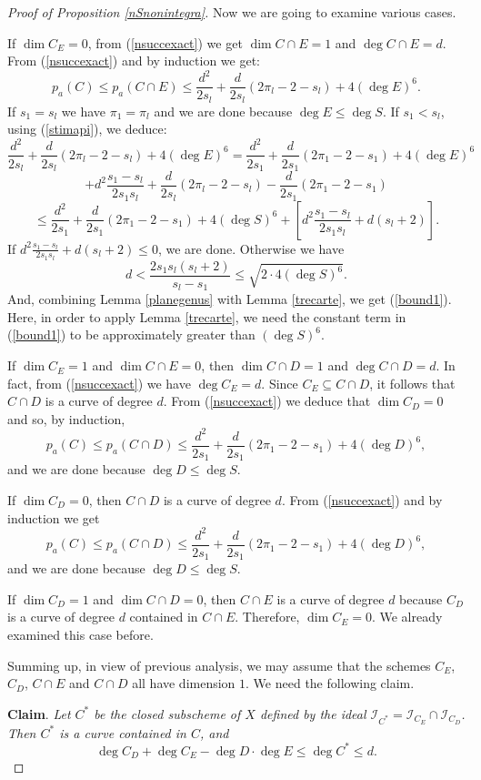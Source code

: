 \documentclass[9pt,a4paper]{amsart}
\theoremstyle{plain}
\theoremstyle{definition}
\theoremstyle{remark}
\begin{document}
\begin{proof}[Proof of Proposition \ref{nSnonintegra}]
Now we are going to examine various cases.

\smallskip
If $\dim C_E=0$, from (\ref{nsuccexact}) we get $\dim C\cap E=1$ and
$\deg C \cap E=d$. From
 (\ref{nsuccexact}) and by induction we get:
$$
p_a(C)\leq p_a(C\cap E)\leq
\frac{d^2}{2s_l}+\frac{d}{2s_l}(2\pi_l-2-s_l)+4(\deg E)^6.
$$
If $s_1=s_l$ we have $\pi_1=\pi_l$ and we are done because $\deg
E\leq \deg S$. If $s_1<s_l$, using (\ref{stimapi}), we deduce:
$$
\frac{d^2}{2s_l}+\frac{d}{2s_l}(2\pi_l-2-s_l)+4(\deg E)^6
=\frac{d^2}{2s_1}+\frac{d}{2s_1}(2\pi_1-2-s_1)+4(\deg E)^6
$$
$$
+
d^2\frac{s_1-s_l}{2s_1s_l}+\frac{d}{2s_l}(2\pi_l-2-s_l)-\frac{d}{2s_1}(2\pi_1-2-s_1)
$$
$$
\leq \frac{d^2}{2s_1}+\frac{d}{2s_1}(2\pi_1-2-s_1)+4(\deg
S)^6+\left[d^2\frac{s_1-s_l}{2s_1s_l}+d(s_l+2)\right].
$$
If $d^2\frac{s_1-s_l}{2s_1s_l}+d(s_l+2)\leq 0$, we are done.
Otherwise we have
$$
d< \frac{2s_1s_l(s_l+2)}{s_l-s_1}\leq \sqrt{2\cdot 4(\deg S)^6}.
$$
And, combining Lemma \ref{planegenus} with Lemma \ref{trecarte}, we
get (\ref{bound1}). Here, in order to apply  Lemma \ref{trecarte},
we need the constant term in (\ref{bound1}) to be
approximately greater than $(\deg S)^6$.





\smallskip
If $\dim C_E=1$ and $\dim C\cap E=0$, then $\dim C\cap D=1$ and
$\deg C\cap D=d$. In fact, from (\ref{nsuccexact}) we have $\deg
C_E=d$. Since  $C_E\subseteq C\cap D$, it follows that  $C\cap D$ is
a curve of degree $d$. From (\ref{nsuccexact}) we deduce that $\dim
C_D=0$ and so, by induction,
$$
p_a(C)\leq p_a(C\cap D)\leq
\frac{d^2}{2s_1}+\frac{d}{2s_1}(2\pi_1-2-s_1)+4(\deg D)^6,
$$
and we are done because $\deg D\leq \deg S$.


\smallskip
If $\dim C_D=0$, then  $C\cap D$ is a curve of degree $d$. From
(\ref{nsuccexact}) and by induction we get
$$
p_a(C)\leq p_a(C\cap D)\leq
\frac{d^2}{2s_1}+\frac{d}{2s_1}(2\pi_1-2-s_1)+4(\deg D)^6,
$$
and we are done because $\deg D\leq \deg S$.


\smallskip
If $\dim C_D=1$ and $\dim C\cap D=0$, then $C\cap E$ is a curve of
degree $d$ because $C_D$ is a curve of degree $d$  contained in $C\cap E$.
Therefore, $\dim C_E=0$. We already examined this case
before.

\smallskip
Summing up, in view of previous analysis, we may assume that the
schemes  $C_E$, $C_D$, $C\cap E$ and $C\cap D$ all have dimension
$1$. We need the following claim.

\smallskip
{\bf {Claim}}. {\it Let $C^*$ be the closed subscheme of $X$
defined by the ideal $\mathcal I_{C^*}=\mathcal I_{C_E}\cap \mathcal
I_{C_D}$. Then $C^*$ is a curve contained in $C$, and
$$
\deg C_D+\deg C_E-\deg D\cdot\deg E\leq \deg C^*\leq d.
$$
}


\end{proof}
\end{document}
